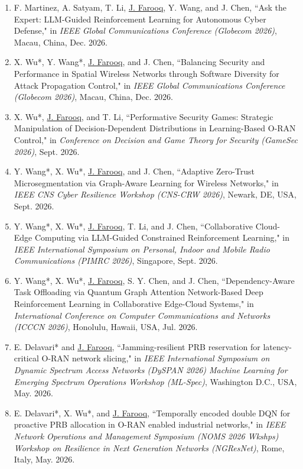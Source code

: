 \documentclass[letterpaper,11pt]{article}
\begin{document}
      \begin{enumerate}
      \item[\rm{[C49]}] F. Martinez, A. Satyam, T. Li, \underline{J. Farooq}, Y. Wang, and J. Chen, ``Ask the Expert: LLM-Guided Reinforcement Learning for Autonomous Cyber Defense," in \emph{IEEE Global Communications Conference (Globecom 2026)}, Macau, China, Dec. 2026.
      \item[\rm{[C48]}] X. Wu*, Y. Wang*, \underline{J. Farooq}, and J. Chen, ``Balancing Security and Performance in Spatial Wireless Networks through Software Diversity for Attack Propagation Control," in \emph{IEEE Global Communications Conference (Globecom 2026)}, Macau, China, Dec. 2026.
      \item[\rm{[C47]}] X. Wu*, \underline{J. Farooq}, and T. Li, ``Performative Security Games: Strategic Manipulation of Decision-Dependent Distributions in Learning-Based O-RAN Control," in \emph{Conference on Decision and Game Theory for Security (GameSec 2026)}, Sept. 2026.
      \item[\rm{[C46]}] Y. Wang*, X. Wu*, \underline{J. Farooq}, and J. Chen, ``Adaptive Zero-Trust Microsegmentation via Graph-Aware Learning for Wireless Networks," in \emph{IEEE CNS Cyber Resilience Workshop (CNS-CRW 2026)}, Newark, DE, USA, Sept. 2026.
       \item[\rm{[C45]}] Y. Wang*, X. Wu*, \underline{J. Farooq}, T. Li, and J. Chen, ``Collaborative Cloud-Edge Computing via LLM-Guided Constrained Reinforcement Learning," in \emph{IEEE International Symposium on Personal, Indoor and Mobile Radio Communications (PIMRC 2026)}, Singapore, Sept. 2026.
      \item[\rm{[C44]}] Y. Wang*, X. Wu*, \underline{J. Farooq}, S. Y. Chen, and J. Chen, ``Dependency-Aware Task Offloading via Quantum Graph Attention Network-Based Deep Reinforcement Learning in Collaborative Edge-Cloud Systems," in \emph{International Conference on Computer Communications and Networks (ICCCN 2026)}, Honolulu, Hawaii, USA, Jul. 2026.
      \item[\rm{[C43]}] E. Delavari* and \underline{J. Farooq}, ``Jamming-resilient PRB reservation for latency-critical O-RAN network slicing," in \emph{IEEE International Symposium on Dynamic Spectrum Access Networks (DySPAN 2026) Machine Learning for Emerging Spectrum Operations Workshop (ML-Spec)}, Washington D.C., USA, May. 2026.
      \item[\rm{[C42]}] E. Delavari*, X. Wu*, and \underline{J. Farooq}, ``Temporally encoded double DQN for proactive PRB allocation in O-RAN enabled industrial networks," in \emph{IEEE Network Operations and Management Symposium (NOMS 2026 Wkshps) Workshop on Resilience in Next Generation Networks (NGResNet)}, Rome, Italy, May. 2026.

\end{enumerate}
\end{document}
